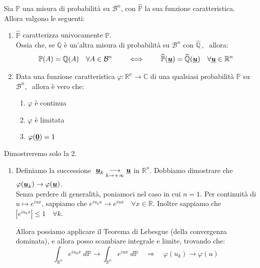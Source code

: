 \begin{teorema}
\label{th:12.3}
    Sia $\mathbb{P}$ una misura di probabilità su $\mathcal{B}^n$, con $\widehat{\mathbb{P}}$ la sua funzione caratteristica. Allora valgono le seguenti:
    \begin{enumerate}
        \item $\widehat{\mathbb{P}}$ caratterizza univocamente $\mathbb{P}$. \\
        Ossia che, se $\mathbb{Q}$ è un'altra misura di probabilità su $\mathcal{B}^n$ con $\widehat{\mathbb{Q}}\,, \;$ allora:
        \[\mathbb{P}(A) = \mathbb{Q}(A) \quad \forall A\in \mathcal{B}^n \qquad \iff \qquad \widehat{\mathbb{P}}(\underline{{\boldsymbol{u}}}) = \widehat{\mathbb{Q}}(\underline{{\boldsymbol{u}}})\quad \forall \underline{{\boldsymbol{u}}}\in\mathbb{R}^n\]
        \item Data una funzione caratteristica $\varphi:\mathbb{R^n}\to \mathbb{C}$  di una qualsiasi probabilità $\mathbb{P}$ su $\mathcal{B}^n,\; $ allora è vero che:
        \begin{enumerate}
            \item $\varphi$ è continua
            \item $\varphi$ è limitata 
            \item $\varphi(\underline{{\boldsymbol{0}}}) = 1$
        \end{enumerate}
    \end{enumerate}
    \begin{dimostrazione}
        Dimostreremo solo la 2.
        \begin{enumerate}
            \item Definiamo la successione $\;\underline{{\boldsymbol{u}}}_k \underset{\small k\to+\infty}{\longrightarrow} \underline{{\boldsymbol{u}}}$ in $\mathbb{R}^n$. Dobbiamo dimostrare che $\varphi(\underline{{\boldsymbol{u}}}_k)\to \varphi(\underline{{\boldsymbol{u}}})$.\\
            Senza perdere di generalità, poniamoci nel caso in cui $n=1$. Per continuità di $u\mapsto e^{iux}$, sappiamo che $e^{iu_kx}\to e^{iux}\quad \forall x\in \mathbb{R}$. Inoltre sappiamo che $\left|e^{iu_k x}\right|\leq1 \quad \forall k$. 

            \medskip
            \noindent Allora possiamo applicare il Teorema di Lebesgue (della convergenza dominata), e allora posso scambiare integrale e limite, trovando che:
            \[\int_{\mathbb{R}^n} e^{iu_k x}\;d\mathbb{P} \longrightarrow \int_{\mathbb{R}^n} e^{iu x}\; d\mathbb{P} \quad \Rightarrow \quad \varphi(u_k)\to \varphi(u)\] 
        \end{enumerate}
    \end{dimostrazione}
\end{teorema}

